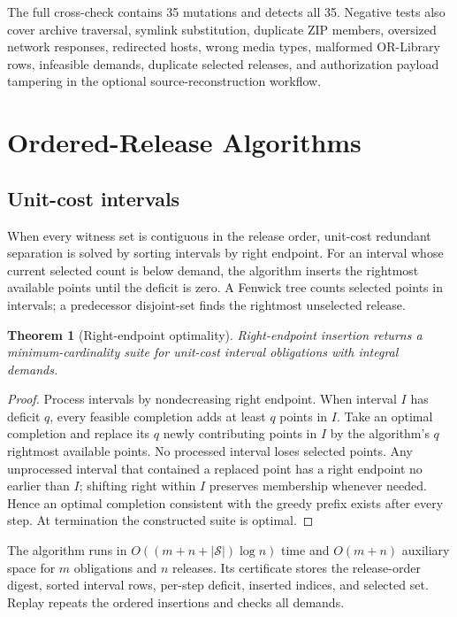 \documentclass[10pt,conference]{IEEEtran}
\newtheorem{theorem}{Theorem}
\newcommand{\Suit}{\mathcal{S}}
\begin{document}
The full cross-check contains 35 mutations and detects all 35. Negative tests also cover archive traversal, symlink substitution, duplicate ZIP members, oversized network responses, redirected hosts, wrong media types, malformed OR-Library rows, infeasible demands, duplicate selected releases, and authorization payload tampering in the optional source-reconstruction workflow.

\section{Ordered-Release Algorithms}
\subsection{Unit-cost intervals}
When every witness set is contiguous in the release order, unit-cost redundant separation is solved by sorting intervals by right endpoint. For an interval whose current selected count is below demand, the algorithm inserts the rightmost available points until the deficit is zero. A Fenwick tree counts selected points in intervals; a predecessor disjoint-set finds the rightmost unselected release.

\begin{theorem}[Right-endpoint optimality]
Right-endpoint insertion returns a minimum-cardinality suite for unit-cost interval obligations with integral demands.
\end{theorem}
\begin{proof}
Process intervals by nondecreasing right endpoint. When interval $I$ has deficit $q$, every feasible completion adds at least $q$ points in $I$. Take an optimal completion and replace its $q$ newly contributing points in $I$ by the algorithm's $q$ rightmost available points. No processed interval loses selected points. Any unprocessed interval that contained a replaced point has a right endpoint no earlier than $I$; shifting right within $I$ preserves membership whenever needed. Hence an optimal completion consistent with the greedy prefix exists after every step. At termination the constructed suite is optimal.
\end{proof}

The algorithm runs in $O((m+n+|\Suit|)\log n)$ time and $O(m+n)$ auxiliary space for $m$ obligations and $n$ releases. Its certificate stores the release-order digest, sorted interval rows, per-step deficit, inserted indices, and selected set. Replay repeats the ordered insertions and checks all demands.
\end{document}
